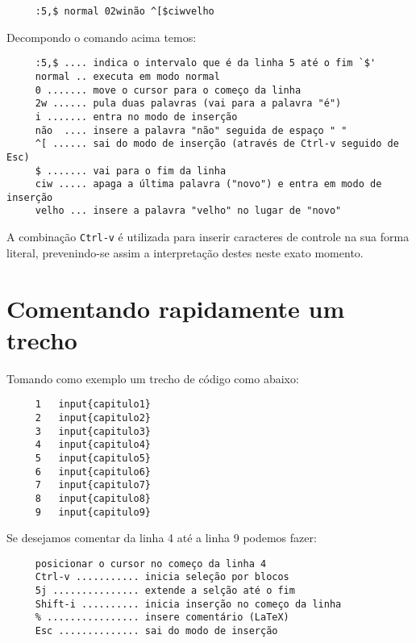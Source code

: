 \begin{verbatim}
     :5,$ normal 02winão ^[$ciwvelho
\end{verbatim}

Decompondo o comando acima temos:

\begin{verbatim}
     :5,$ .... indica o intervalo que é da linha 5 até o fim `$'
     normal .. executa em modo normal
     0 ....... move o cursor para o começo da linha
     2w ...... pula duas palavras (vai para a palavra "é")
     i ....... entra no modo de inserção
     não  .... insere a palavra "não" seguida de espaço " "
     ^[ ...... sai do modo de inserção (através de Ctrl-v seguido de Esc)
     $ ....... vai para o fim da linha
     ciw ..... apaga a última palavra ("novo") e entra em modo de inserção
     velho ... insere a palavra "velho" no lugar de "novo"
\end{verbatim}

A combinação \verb|Ctrl-v| é utilizada para inserir caracteres de controle na
sua forma literal, prevenindo-se assim a interpretação destes neste exato
momento.

\section{Comentando rapidamente um trecho}

Tomando como exemplo um trecho de código como abaixo:

\begin{verbatim}
     1   input{capitulo1}
     2   input{capitulo2}
     3   input{capitulo3}
     4   input{capitulo4}
     5   input{capitulo5}
     6   input{capitulo6}
     7   input{capitulo7}
     8   input{capitulo8}
     9   input{capitulo9}
\end{verbatim}

Se desejamos comentar da linha 4 até a linha 9 podemos fazer:

\begin{verbatim}
     posicionar o cursor no começo da linha 4
     Ctrl-v ........... inicia seleção por blocos
     5j ............... extende a selção até o fim
     Shift-i .......... inicia inserção no começo da linha
     % ................ insere comentário (LaTeX)
     Esc .............. sai do modo de inserção
\end{verbatim}


